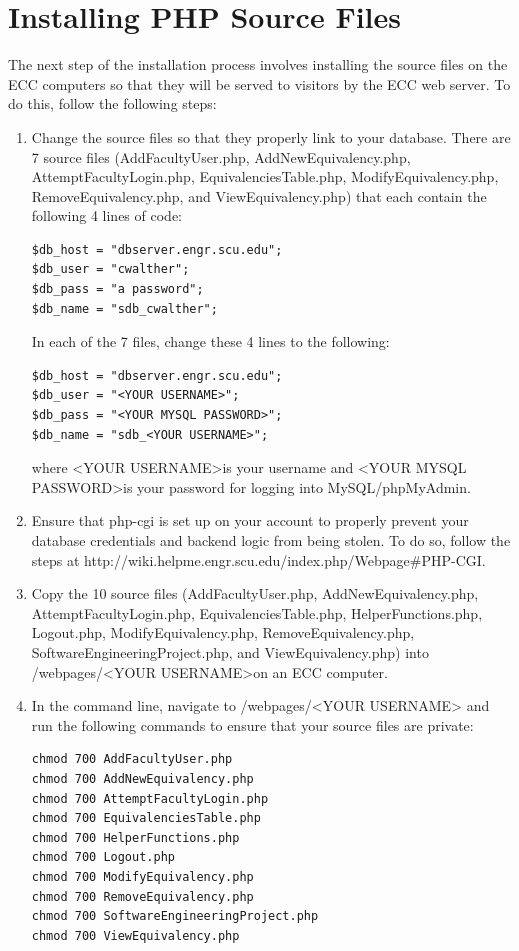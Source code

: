 \documentclass{article}
\begin{document}
\section{Installing PHP Source Files}
\par The next step of the installation process involves installing the source
files on the ECC computers so that they will be served to visitors by the ECC
web server.  To do this, follow the following steps:
\begin{enumerate}
\item Change the source files so that they properly link to your database.
There are 7 source files (AddFacultyUser.php, AddNewEquivalency.php,
AttemptFacultyLogin.php, EquivalenciesTable.php, ModifyEquivalency.php,
RemoveEquivalency.php, and ViewEquivalency.php) that each contain the following 4
lines of code:
\begin{lstlisting}
$db_host = "dbserver.engr.scu.edu";
$db_user = "cwalther";
$db_pass = "a password";
$db_name = "sdb_cwalther";
\end{lstlisting}
In each of the 7 files, change these 4 lines to the following:
\begin{lstlisting}
$db_host = "dbserver.engr.scu.edu";
$db_user = "<YOUR USERNAME>";
$db_pass = "<YOUR MYSQL PASSWORD>";
$db_name = "sdb_<YOUR USERNAME>";
\end{lstlisting}
where \textless YOUR USERNAME\textgreater  is your username and \textless YOUR
MYSQL PASSWORD\textgreater  is your
password for logging into MySQL/phpMyAdmin.
\item Ensure that php-cgi is set up on your account to properly prevent your
database credentials and backend logic from being stolen.  To do so, follow the
steps at \newline http://wiki.helpme.engr.scu.edu/index.php/Webpage\#PHP-CGI.
\item Copy the 10 source files
(AddFacultyUser.php, AddNewEquivalency.php, AttemptFacultyLogin.php,
EquivalenciesTable.php, HelperFunctions.php, Logout.php, ModifyEquivalency.php,
RemoveEquivalency.php, SoftwareEngineeringProject.php, and ViewEquivalency.php)
into /webpages/\textless YOUR USERNAME\textgreater  on an ECC computer.
\item In the command line, navigate to /webpages/\textless YOUR USERNAME\textgreater
and run the
following commands to ensure that your source files are private:
\begin{lstlisting}
chmod 700 AddFacultyUser.php
chmod 700 AddNewEquivalency.php
chmod 700 AttemptFacultyLogin.php
chmod 700 EquivalenciesTable.php
chmod 700 HelperFunctions.php
chmod 700 Logout.php
chmod 700 ModifyEquivalency.php
chmod 700 RemoveEquivalency.php
chmod 700 SoftwareEngineeringProject.php
chmod 700 ViewEquivalency.php
\end{lstlisting}
\end{enumerate}
\end{document}
